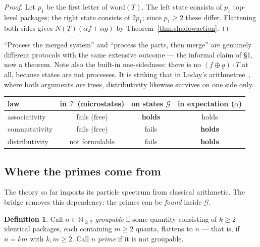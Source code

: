 \documentclass[11pt]{article}
\newcommand{\cT}{\mathcal{T}}   %
\newcommand{\cG}{\mathcal{G}}   %
\newcommand{\NN}{\mathbb{N}}
\numberwithin{equation}{section}
\theoremstyle{plain}
\theoremstyle{definition}
\newtheorem{definition}[theorem]{Definition}
\theoremstyle{remark}
\begin{document}
\begin{proof}
Let $p_1$ be the first letter of $\mathrm{word}(T)$. The left state consists of $p_1$
top-level packages; the right state consists of $2p_1$; since $p_1 \ge 2$ these
differ. Flattening both sides gives $N(T)(\alpha f + \alpha g)$ by
Theorem~\ref{thm:shadowaction}.
\end{proof}

``Process the merged system'' and ``process the parts, then merge'' are genuinely
different protocols with the same extensive outcome --- the informal claim of \S1,
now a theorem. Note also the built-in one-sidedness: there is no
$(f \oplus g) \cdot T$ at all, because states are not processes. It is striking that
in Loday's arithmetree~\cite{loday}, where both arguments \emph{are} trees,
distributivity likewise survives on one side only.

\begin{center}
\begin{tabular}{@{}lccc@{}}
\toprule
law & in $\cT$ (microstates) & on states $\cG$ & in expectation ($\alpha$) \\
\midrule
associativity & fails (free) & \textbf{holds} & holds \\
commutativity & fails (free) & fails & \textbf{holds} \\
distributivity & not formulable & fails & \textbf{holds} \\
\bottomrule
\end{tabular}
\end{center}

\subsection{Where the primes come from}\label{sec:primesfrom}

The theory so far imports its particle spectrum from classical arithmetic. The bridge
removes this dependency: the primes can be \emph{found} inside $\cG$.

\begin{definition}\label{def:groupable}
Call $n \in \NN_{\ge 2}$ \emph{groupable} if some quantity consisting of $k \ge 2$
identical packages, each containing $m \ge 2$ quanta, flattens to $n$ --- that is, if
$n = km$ with $k, m \ge 2$. Call $n$ \emph{prime} if it is not groupable.
\end{definition}
\end{document}
